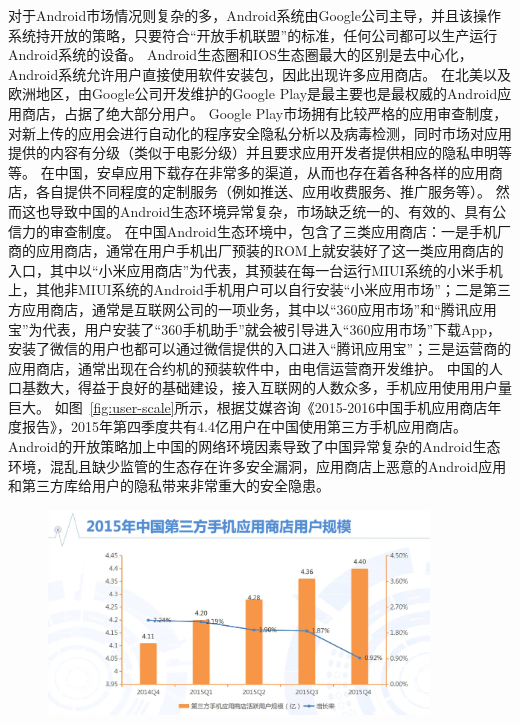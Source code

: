 对于Android市场情况则复杂的多，Android系统由Google公司主导，并且该操作系统持开放的策略，只要符合“开放手机联盟”的标准，任何公司都可以生产运行Android系统的设备。
Android生态圈和IOS生态圈最大的区别是去中心化，Android系统允许用户直接使用软件安装包，因此出现许多应用商店。
在北美以及欧洲地区，由Google公司开发维护的Google Play是最主要也是最权威的Android应用商店，占据了绝大部分用户。
Google Play市场拥有比较严格的应用审查制度，对新上传的应用会进行自动化的程序安全隐私分析以及病毒检测，同时市场对应用提供的内容有分级（类似于电影分级）并且要求应用开发者提供相应的隐私申明等等。
在中国，安卓应用下载存在非常多的渠道，从而也存在着各种各样的应用商店，各自提供不同程度的定制服务（例如推送、应用收费服务、推广服务等）。
然而这也导致中国的Android生态环境异常复杂，市场缺乏统一的、有效的、具有公信力的审查制度。
在中国Android生态环境中，包含了三类应用商店：一是手机厂商的应用商店，通常在用户手机出厂预装的ROM上就安装好了这一类应用商店的入口，其中以“小米应用商店”为代表，其预装在每一台运行MIUI系统的小米手机上，其他非MIUI系统的Android手机用户可以自行安装“小米应用市场”；二是第三方应用商店，通常是互联网公司的一项业务，其中以“360应用市场”和“腾讯应用宝”为代表，用户安装了“360手机助手”就会被引导进入“360应用市场”下载App，安装了微信的用户也都可以通过微信提供的入口进入“腾讯应用宝”；三是运营商的应用商店，通常出现在合约机的预装软件中，由电信运营商开发维护。
中国的人口基数大，得益于良好的基础建设，接入互联网的人数众多，手机应用使用用户量巨大。
如图~\ref{fig:user-scale}所示，根据艾媒咨询《2015-2016中国手机应用商店年度报告》，2015年第四季度共有4.4亿用户在中国使用第三方手机应用商店。
Android的开放策略加上中国的网络环境因素导致了中国异常复杂的Android生态环境，混乱且缺少监管的生态存在许多安全漏洞，应用商店上恶意的Android应用和第三方库给用户的隐私带来非常重大的安全隐患。

\begin{figure}
	\centering
	\includegraphics[width=0.9\textwidth]{figure/user-scale.png}
\end{figure}


